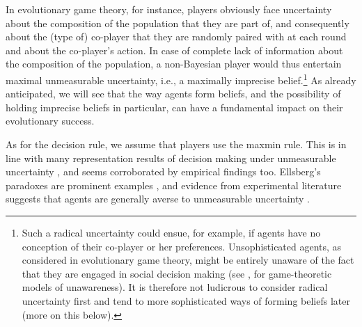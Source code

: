 \documentclass[fleqn,reqno,12pt]{article}
\theoremstyle{Satz}
\theoremstyle{Bsp}
\begin{document}
In evolutionary game theory, for instance, players obviously face uncertainty
about the composition of the population that they are part of, and consequently about the (type of)
co-player that they are randomly paired with at each round and about the co-player's action. In
case of complete lack of information about the composition of the population, a non-Bayesian player would thus entertain maximal
unmeasurable uncertainty, i.e., a maximally imprecise belief.\footnote{Such a radical
  uncertainty could ensue, for example, if agents have no conception of their co-player or her
  preferences. Unsophisticated agents, as considered in evolutionary game theory, might be
  entirely unaware of the fact that they are engaged in social decision making (see \cite{HeifetzMeier2009:Dynamic-Unaware}, for
  game-theoretic models of unawareness). It is therefore
  not ludicrous to consider radical uncertainty first and tend to more
  sophisticated ways of forming beliefs later (more on this below).} As already anticipated, we
will see that the way agents form beliefs, and the possibility of holding imprecise beliefs
in particular, can have a fundamental impact on their evolutionary success.

As for the decision rule, we assume that players use the maxmin rule. This is in line with many
representation results of decision making under unmeasurable uncertainty
\citep[e.g.,][]{gilsch89,GhirMar02}, and seems corroborated by empirical findings
too. Ellsberg's paradoxes are prominent examples \citep{ells61}, and evidence from experimental
literature suggests that agents are generally averse to unmeasurable uncertainty
\citep[e.g.,][]{TrautKuil16}.
\end{document}

